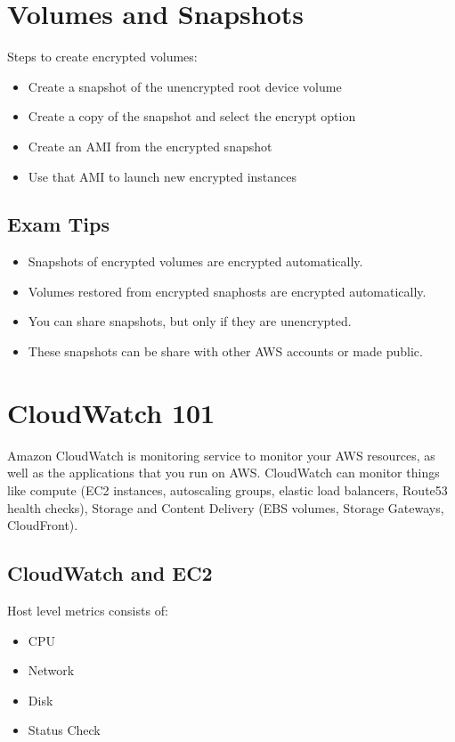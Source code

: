 \documentclass{article}
\begin{document}
\section{Volumes and Snapshots}
Steps to create encrypted volumes:
\begin{itemize}
\item
Create a snapshot of the unencrypted root device volume

\item
Create a copy of the snapshot and select the encrypt option

\item
Create an AMI from the encrypted snapshot

\item
Use that AMI to launch new encrypted instances
\end{itemize}
\subsection{Exam Tips}
\begin{itemize}
\item
Snapshots of encrypted volumes are encrypted automatically.

\item
Volumes restored from encrypted snaphosts are encrypted automatically.

\item
You can share snapshots, but only if they are unencrypted.

\item
These snapshots can be share with other AWS accounts or made public.
\end{itemize}

\section{CloudWatch 101}
Amazon CloudWatch is monitoring service to monitor your AWS resources, as well as the applications that you run on AWS. CloudWatch can monitor things like compute (EC2 instances, autoscaling groups, elastic load balancers, Route53 health checks), Storage and Content Delivery (EBS volumes, Storage Gateways, CloudFront).

\subsection{CloudWatch and EC2}
Host level metrics consists of:
\begin{itemize}
\item
CPU

\item
Network

\item
Disk

\item
Status Check
\end{itemize}
\end{document}
